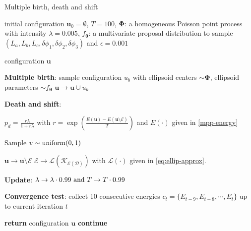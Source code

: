 \documentclass[journal]{IEEEtran}
\begin{document}
\begin{algorithm}
  \caption{Multiple birth, death and shift}
  \label{algo-mbds}
  \begin{algorithmic}[1]

    \REQUIRE initial configuration $\mathbf{u}_0 = \emptyset$,
    $T = 100$, $\mathbf{\Phi}$: a homogeneous Poisson point process
    with intensity $\lambda = 0.005$, $f_{\boldsymbol{\theta}}$: a
    multivariate proposal distribution to sample
    $ \left( L_a, L_b, L_c, \delta{\phi_1}, \delta{\phi_2},
      \delta{\phi_3} \right)$ and $\epsilon = 0.001$

    \ENSURE configuration $\mathbf{u}$

    \vspace{1mm} \REPEAT

    \vspace{1mm} \STATE \textbf{Multiple birth}: sample configuration
    $u_b$ with ellipsoid centers $\sim \mathbf{\Phi}$, ellipsoid
    parameters $\sim f_{\boldsymbol{\theta}}$ \label{itr} \STATE
    $\mathbf{u} \rightarrow \mathbf{u} \cup u_b$

    \vspace{1mm} \STATE \textbf{Death and shift}:

     \STATE
    $p_d = \frac{r\lambda}{1 + r\lambda}$ with
    $r = \exp \left( \frac{ E(\mathbf{u}) - E(\mathbf{u} \setminus
        \mathcal{E}) }{T} \right)$ and $E(\cdot)$ given in
    \eqref{mpp-energy}

    \STATE Sample $v \sim \textnormal{uniform}(0, 1)$

     \STATE
    $\mathbf{u} \rightarrow \mathbf{u} \setminus \mathcal{E}$ \ELSE
    \STATE
    $\mathcal{E} \rightarrow
    \mathcal{L(K_{\mathcal{E}(\mathcal{D})})}$ with
    $\mathcal{L}(\cdot)$ given in \eqref{eq:ellip-approx}.  \ENDIF

    \ENDFOR

    \vspace{1mm} \STATE \textbf{Update}:
    $\lambda \rightarrow \lambda \cdot 0.99 \textnormal{ and } T
    \rightarrow T \cdot 0.99$

    \vspace{1mm} \STATE \textbf{Convergence test}: collect 10
    consecutive energies $c_t = \{E_{t-9}, E_{t-8}, \cdots, E_{t}\}$
    up to current iteration $t$

     \STATE \textbf{return} configuration $\mathbf{u}$
    \ELSE \STATE \textbf{continue} \ENDIF

  \end{algorithmic}
\end{algorithm}
\end{document}
